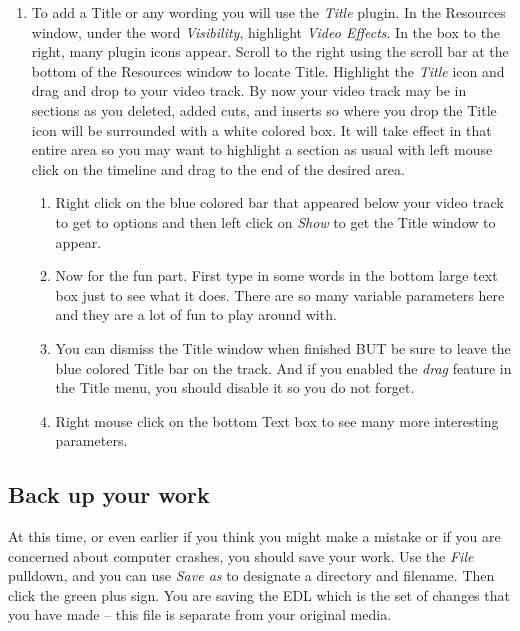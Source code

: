 \begin{enumerate}[resume]
	\item To add a Title or any wording you will use the \textit{Title} plugin.  In the Resources window, under the
	word \textit{Visibility}, highlight \textit{Video Effects}.  In the box to the right, many plugin icons appear.   Scroll
	to the right using the scroll bar at the bottom of the Resources window to locate Title.  Highlight the
	\textit{Title} icon and drag and drop to your video track.  By now your video track may be in sections as you
	deleted, added cuts, and inserts so where you drop the Title icon will be surrounded with a
	white colored box.  It will take effect in that entire area so you may want to highlight a section as
	usual with left mouse click on the timeline and drag to the end of the desired area.
	\begin{enumerate}
		\item Right click on the blue colored bar that appeared below your video track to get to options and
		then left click on \textit{Show} to get the Title window to appear.
		\item Now for the fun part.  First type in some words in the bottom large text box just to see what it
		does.  There are so many variable parameters here and they are a lot of fun to play around with.
		\item You can dismiss the Title window when finished BUT be sure to leave the blue colored Title bar
		on the track.  And if you enabled the \textit{drag} feature in the Title menu, you should disable it so you do not forget.
		\item Right mouse click on the bottom Text box to see many more interesting parameters.
	\end{enumerate}
\end{enumerate}

\subsection{Back up your work}%
\label{sub:backup_your_work}

At this time, or even earlier if you think you might make a mistake or if you are concerned about computer crashes, you should save your work.  Use the \textit{File} pulldown, and you can use \textit{Save as} to designate a directory and filename.  Then click the green plus sign.  You are saving the EDL which is the set of changes that you have made -- this file is separate from your original media.

